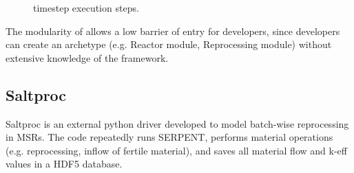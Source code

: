 \begin{figure}[h]
\centering
{}
\caption{\Cyclus timestep execution steps.}
\label{fig:time}
\end{figure}

The modularity of \Cyclus allows a low barrier of
entry for developers, since developers can create an
archetype (e.g. Reactor module, Reprocessing module)
without extensive knowledge of the \Cyclus framework.

\subsection{Saltproc}
Saltproc is an external python driver developed to
model batch-wise reprocessing in \glspl{MSR}. The code
repeatedly runs SERPENT, performs material operations (e.g. reprocessing,
inflow of fertile material), and saves all material flow
and k-eff values in a HDF5 database. 
